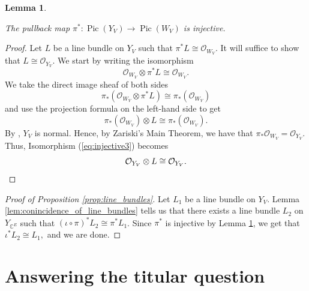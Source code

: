 \documentclass{amsart}
\theoremstyle{plain}
\newtheorem{lemma}[theorem]{Lemma}
\theoremstyle{definition}
\newcommand{\Pic}{\operatorname{Pic}}
\begin{document}
\begin{lemma}
\label{lem:pullback_injective}

The pullback map $\pi^*: \Pic(Y_V) \to \Pic(W_V)$ is injective.
\end{lemma}

\begin{proof}

    Let $L$ be a line bundle on $Y_V$ such that ${\pi}^*L \cong \mathcal{O}_{W_V}.$ It will suffice to show that $L \cong \mathcal{O}_{Y_V}$. We start by writing the isomorphism
    \begin{equation*}
    \label{eq:injective1}
    \mathcal{O}_{W_V} \otimes \pi^*L \cong \mathcal{O}_{W_V}.
    \end{equation*}
    We take the direct image sheaf of both sides
    \begin{equation*}
    \label{eq:injective2}
    \pi_*(\mathcal{O}_{W_V} \otimes \pi^*L) \cong \pi_*(\mathcal{O}_{W_V})
    \end{equation*}
    and use the projection formula on the left-hand side to get
    \begin{equation}
    \label{eq:injective3}
    \pi_*(\mathcal{O}_{W_V}) \otimes L \cong \pi_*(\mathcal{O}_{W_V}).
    \end{equation}
    By \cite[Theorem 4.1]{crowley_proudfoot}, $Y_V$ is normal. Hence, by Zariski's Main Theorem, we have that $\pi_*\mathcal{O}_{W_V} = \mathcal{O}_{Y_V}.$ Thus, Isomorphism (\ref{eq:injective3}) becomes
    \begin{equation*}
    \label{eq:injective4}
    \mathcal{O}_{Y_V} \otimes L \cong \mathcal{O}_{Y_V}. \qedhere
    \end{equation*}      
    
\end{proof}

\begin{proof}[Proof of Proposition \ref{prop:line_bundles}]
Let $L_1$ be a line bundle on $Y_V$. Lemma \ref{lem:conincidence_of_line_bundles} tells us that there exists a line bundle $L_2$ on $Y_{\mathbb{C}^E}$ such that $(\iota \circ \pi)^*L_2 \cong \pi^*L_1$. Since $\pi^*$ is injective by Lemma \ref{lem:pullback_injective}, we get that $\iota^*L_2 \cong L_1,$ and we are done.
\end{proof}

\section{Answering the titular question}
\end{document}
